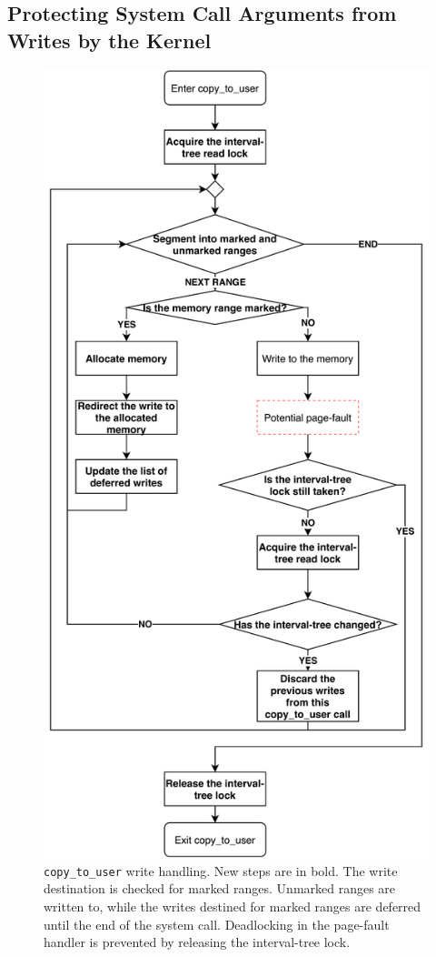 \documentclass[conference]{IEEEtran}
\begin{document}
\subsection{Protecting System Call Arguments from Writes by the Kernel}
\label{subsec:kernelland}
\begin{figure}[]
  \centering
  \includegraphics[width = 0.8\linewidth]{img/copy_to_user.pdf}
  \caption{\texttt{copy\_to\_user} write handling. New steps are in bold.
  The write destination is checked for marked ranges. Unmarked ranges are written to, while
  the writes destined for marked ranges are deferred until the end of the system call. Deadlocking
  in the page-fault handler is prevented by releasing the interval-tree lock.
}
  \label{fig:copytouser}
\end{figure}
\end{document}
